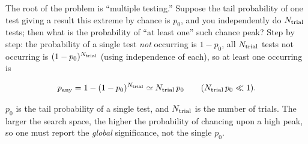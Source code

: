 The root of the problem is ``multiple testing.'' Suppose the tail probability of one test giving a result this extreme by chance is \(p_0\), and you independently do \(N_{\rm trial}\) tests; then what is the probability of ``at least one'' such chance peak? Step by step: the probability of a single test \emph{not} occurring is \(1-p_0\), all \(N_{\rm trial}\) tests not occurring is \((1-p_0)^{N_{\rm trial}}\) (using independence of each), so at least one occurring is

\begin{equation}
  p_{\rm any}=1-(1-p_0)^{N_{\rm trial}}
  \simeq N_{\rm trial}\,p_0
  \qquad(N_{\rm trial}\,p_0\ll1).
  \label{eq:e27-trials}
\end{equation}
\begin{formulaexplain}
\(p_0\) is the tail probability of a single test, and \(N_{\rm trial}\) is the number of trials. The larger the search space, the higher the probability of chancing upon a high peak, so one must report the \emph{global} significance, not the single \(p_0\).
\end{formulaexplain}


